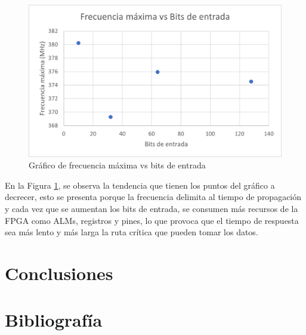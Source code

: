 \documentclass[journal]{IEEEtran}
\begin{document}
	\begin{figure}[hbtp]
		\centering
		\includegraphics[scale = 0.65]{img/chart1.png}
		\caption{Gráfico de frecuencia máxima vs bits de entrada}
		\label{fig:cha}
	\end{figure}
	
	En la Figura \ref{fig:cha}, se observa la tendencia que tienen los puntos del gráfico a decrecer, esto se presenta porque la frecuencia delimita al tiempo de propagación y cada vez que se aumentan los bits de entrada, se consumen más recursos de la FPGA como ALMs, registros y pines, lo que provoca que el tiempo de respuesta sea más lento  y más larga la ruta crítica que pueden tomar los datos.
	
	\section{Conclusiones}
	
	\section{Bibliografía}
	
	
	
	
\end{document}
